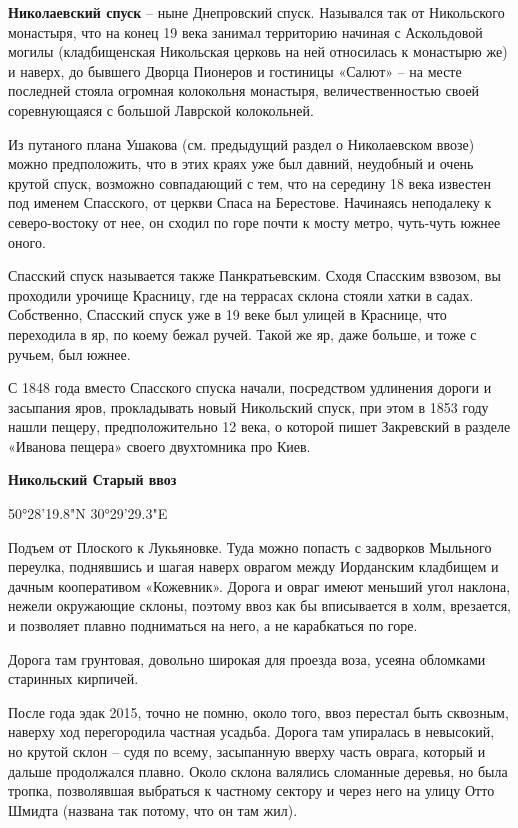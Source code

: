 \textbf{Николаевский спуск} – ныне Днепровский спуск. Назывался так от Никольского монастыря, что на конец 19 века занимал территорию начиная с Аскольдовой могилы (кладбищенская Никольская церковь на ней относилась к монастырю же) и наверх, до бывшего Дворца Пионеров и гостиницы «Салют» – на месте последней стояла огромная колокольня монастыря, величественностью своей соревнующаяся с большой Лаврской колокольней.

Из путаного плана Ушакова (см. предыдущий раздел о Николаевском ввозе) можно предположить, что в этих краях уже был давний, неудобный и очень крутой спуск, возможно совпадающий с тем, что на середину 18 века известен под именем Спасского, от церкви Спаса на Берестове. Начинаясь неподалеку к северо-востоку от нее, он сходил по горе почти к мосту метро, чуть-чуть южнее оного. 

Спасский спуск называется также Панкратьевским. Сходя Спасским взвозом, вы проходили урочище Красницу, где на террасах склона стояли хатки в садах. Собственно, Спасский спуск уже в 19 веке был улицей в Краснице, что переходила в яр, по коему бежал ручей. Такой же яр, даже больше, и тоже с ручьем, был южнее.

С 1848 года вместо Спасского спуска начали, посредством удлинения дороги и засыпания яров, прокладывать новый Никольский спуск, при этом в 1853 году нашли пещеру, предположительно 12 века, о которой пишет Закревский в разделе «Иванова пещера» своего двухтомника про Киев.\\


\medskip


\textbf{Никольский Старый ввоз} 

50°28'19.8"N 30°29'29.3"E

Подъем от Плоского к Лукьяновке. Туда можно попасть с задворков Мыльного переулка, поднявшись и шагая наверх оврагом между Иорданским кладбищем и дачным кооперативом «Кожевник». Дорога и овраг имеют меньший угол наклона, нежели окружающие склоны, поэтому ввоз как бы вписывается в холм, врезается, и позволяет плавно подниматься на него, а не карабкаться по горе.

Дорога там грунтовая, довольно широкая для проезда воза, усеяна обломками старинных кирпичей.

После года эдак 2015, точно не помню, около того, ввоз перестал быть сквозным, наверху ход перегородила частная усадьба. Дорога там упиралась в невысокий, но крутой склон – судя по всему, засыпанную вверху часть оврага, который и дальше продолжался плавно. Около склона валялись сломанные деревья, но была тропка, позволявшая выбраться к частному сектору и через него на улицу Отто Шмидта (названа так потому, что он там жил).\\

